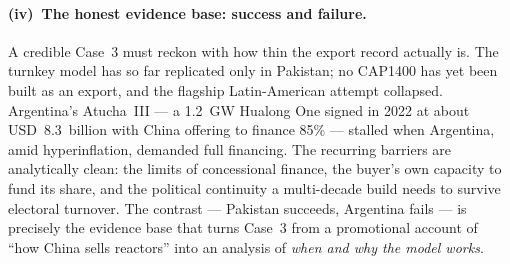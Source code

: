 \documentclass[11pt]{article}
\begin{document}
\paragraph{(iv)~The honest evidence base: success and failure.}
A credible Case~3 must reckon with how thin the export record actually is. The turnkey model has so far replicated only in Pakistan; no CAP1400 has yet been built as an export, and the flagship Latin-American attempt collapsed. Argentina's Atucha~III --- a 1.2~GW Hualong One signed in 2022 at about USD~8.3~billion with China offering to finance 85\% --- stalled when Argentina, amid hyperinflation, demanded full financing.\cite{diplomat_argentina,neutronbytes2026} The recurring barriers are analytically clean: the limits of concessional finance, the buyer's own capacity to fund its share, and the political continuity a multi-decade build needs to survive electoral turnover. The contrast --- Pakistan succeeds, Argentina fails --- is precisely the evidence base that turns Case~3 from a promotional account of ``how China sells reactors'' into an analysis of \emph{when and why the model works}.
\end{document}
